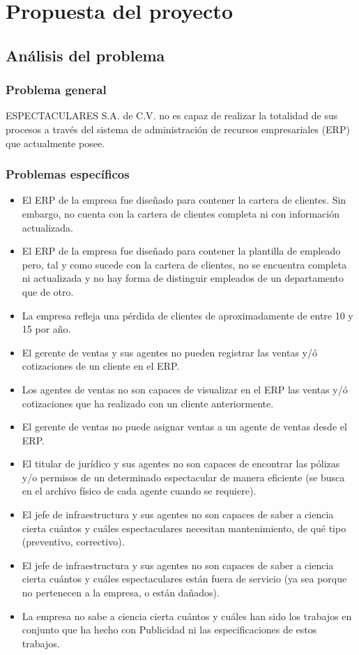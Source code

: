 \chapter{Propuesta del proyecto}
\section{Análisis del problema}
\subsection{Problema general}
ESPECTACULARES S.A. de C.V. no es capaz de realizar la totalidad de sus procesos a través del sistema de administración de recursos empresariales (ERP) que actualmente posee.\par
\subsection{Problemas específicos}
\begin{itemize}
\item{El ERP de la empresa fue diseñado para contener la cartera de clientes. Sin embargo, no cuenta con la cartera de clientes completa ni con información actualizada.}
\item{El ERP de la empresa fue diseñado para contener la plantilla de empleado pero, tal y como sucede con la cartera de clientes, no se encuentra completa ni actualizada y no hay forma de distinguir empleados de un departamento que de otro.}
\item{La empresa refleja una pérdida de clientes de aproximadamente de entre 10 y 15 por año.}
\item{El gerente de ventas y sus agentes no pueden registrar las ventas y/ó cotizaciones de un cliente en el ERP.}
\item{Los agentes de ventas no son capaces de visualizar en el ERP las ventas y/ó cotizaciones que ha realizado con un cliente anteriormente.}
\item{El gerente de ventas no puede asignar ventas a un agente de ventas desde el ERP.}
\item{El titular de jurídico y sus agentes no son capaces de encontrar las pólizas y/o permisos de un determinado espectacular de manera eficiente (se busca en el archivo físico de cada agente cuando se requiere).}
\item{El jefe de infraestructura y sus agentes no son capaces de saber a ciencia cierta cuántos y cuáles espectaculares necesitan mantenimiento, de qué tipo (preventivo, correctivo).}
\item{El jefe de infraestructura y sus agentes no son capaces de saber a ciencia cierta cuántos y cuáles espectaculares están fuera de servicio (ya sea porque no pertenecen a la empresa, o están dañados).}
\item{La empresa no sabe a ciencia cierta cuántos y cuáles han sido los trabajos en conjunto que ha hecho con Publicidad ni las especificaciones de estos trabajos.}
\end{itemize}
